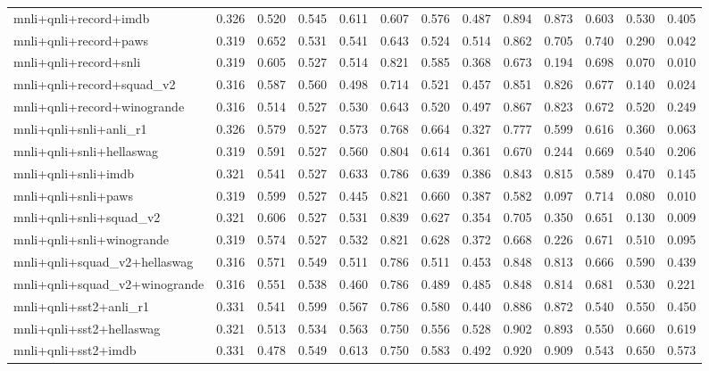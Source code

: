 \begin{table}[t]
\begin{tabular}{lrrrrrrrrrrrr}
    mnli+qnli+record+imdb & 0.326 & 0.520 & 0.545 & 0.611 & 0.607 & 0.576 & 0.487 & 0.894 & 0.873 & 0.603 & 0.530 & 0.405 \\
    mnli+qnli+record+paws & 0.319 & 0.652 & 0.531 & 0.541 & 0.643 & 0.524 & 0.514 & 0.862 & 0.705 & 0.740 & 0.290 & 0.042 \\
    mnli+qnli+record+snli & 0.319 & 0.605 & 0.527 & 0.514 & 0.821 & 0.585 & 0.368 & 0.673 & 0.194 & 0.698 & 0.070 & 0.010 \\
    mnli+qnli+record+squad\_v2 & 0.316 & 0.587 & 0.560 & 0.498 & 0.714 & 0.521 & 0.457 & 0.851 & 0.826 & 0.677 & 0.140 & 0.024 \\
    mnli+qnli+record+winogrande & 0.316 & 0.514 & 0.527 & 0.530 & 0.643 & 0.520 & 0.497 & 0.867 & 0.823 & 0.672 & 0.520 & 0.249 \\
    mnli+qnli+snli+anli\_r1 & 0.326 & 0.579 & 0.527 & 0.573 & 0.768 & 0.664 & 0.327 & 0.777 & 0.599 & 0.616 & 0.360 & 0.063 \\
    mnli+qnli+snli+hellaswag & 0.319 & 0.591 & 0.527 & 0.560 & 0.804 & 0.614 & 0.361 & 0.670 & 0.244 & 0.669 & 0.540 & 0.206 \\
    mnli+qnli+snli+imdb & 0.321 & 0.541 & 0.527 & 0.633 & 0.786 & 0.639 & 0.386 & 0.843 & 0.815 & 0.589 & 0.470 & 0.145 \\
    mnli+qnli+snli+paws & 0.319 & 0.599 & 0.527 & 0.445 & 0.821 & 0.660 & 0.387 & 0.582 & 0.097 & 0.714 & 0.080 & 0.010 \\
    mnli+qnli+snli+squad\_v2 & 0.321 & 0.606 & 0.527 & 0.531 & 0.839 & 0.627 & 0.354 & 0.705 & 0.350 & 0.651 & 0.130 & 0.009 \\
    mnli+qnli+snli+winogrande & 0.319 & 0.574 & 0.527 & 0.532 & 0.821 & 0.628 & 0.372 & 0.668 & 0.226 & 0.671 & 0.510 & 0.095 \\
    mnli+qnli+squad\_v2+hellaswag & 0.316 & 0.571 & 0.549 & 0.511 & 0.786 & 0.511 & 0.453 & 0.848 & 0.813 & 0.666 & 0.590 & 0.439 \\
    mnli+qnli+squad\_v2+winogrande & 0.316 & 0.551 & 0.538 & 0.460 & 0.786 & 0.489 & 0.485 & 0.848 & 0.814 & 0.681 & 0.530 & 0.221 \\
    mnli+qnli+sst2+anli\_r1 & 0.331 & 0.541 & 0.599 & 0.567 & 0.786 & 0.580 & 0.440 & 0.886 & 0.872 & 0.540 & 0.550 & 0.450 \\
    mnli+qnli+sst2+hellaswag & 0.321 & 0.513 & 0.534 & 0.563 & 0.750 & 0.556 & 0.528 & 0.902 & 0.893 & 0.550 & 0.660 & 0.619 \\
    mnli+qnli+sst2+imdb & 0.331 & 0.478 & 0.549 & 0.613 & 0.750 & 0.583 & 0.492 & 0.920 & 0.909 & 0.543 & 0.650 & 0.573 \\

\end{tabular}
\end{table}
